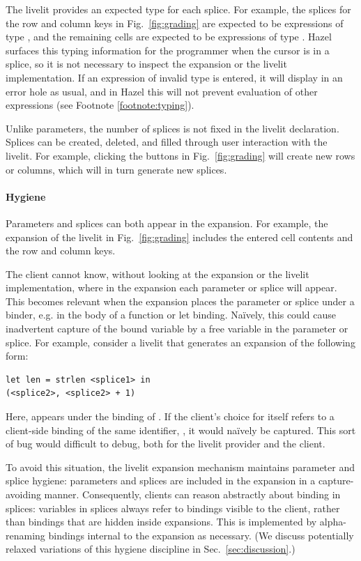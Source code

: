 The livelit provides an expected type for each splice.
For example, the splices for the row and column keys in Fig.~\ref{fig:grading} are expected to be expressions
of type , and the remaining cells are expected to be expressions of type .
Hazel surfaces this typing information for the programmer when the cursor is in a splice,
so it is not necessary to inspect the expansion or the livelit implementation.
If an expression of invalid type is entered, it will display in an error hole as usual,
and in Hazel this will not prevent evaluation of other expressions (see Footnote \ref{footnote:typing}).

Unlike parameters, the number of splices is not fixed in the livelit declaration. Splices can be created,
deleted, and filled through user interaction with the livelit. For example, clicking the \li{+} buttons
in Fig.~\ref{fig:grading} will create new rows or columns, which will in turn generate new splices.

\paragraph{Hygiene}\label{sec:hygiene}
Parameters and splices can both appear in the expansion. For example,
the expansion of the  livelit in Fig.~\ref{fig:grading} includes the
entered cell contents and the row and column keys.

The client cannot know, without looking at the expansion or the livelit implementation,
where in the expansion each parameter or splice will appear. This becomes relevant when
the expansion places the parameter or splice under a binder, e.g. in the body of a function or let binding.
Na\"ively, this could cause inadvertent capture of the bound variable by a free variable
in the parameter or splice. For example, consider a livelit that generates an expansion
of the following form:
\begin{lstlisting}[numbers=none]
let len = strlen <splice1> in
(<splice2>, <splice2> + 1)
\end{lstlisting}
Here,  appears under the binding of . If the client's choice for
 itself refers to a client-side binding of the same identifier, ,
it would na\"ively be captured. This sort of bug would difficult to debug,
both for the livelit provider and the client.

To avoid this situation, the livelit expansion mechanism
maintains parameter and splice hygiene: parameters and splices are included in the expansion
in a capture-avoiding manner.
Consequently, clients can reason abstractly about binding in splices: variables in splices
always refer to bindings visible to the client, rather than bindings that are hidden inside expansions.
This is implemented by alpha-renaming bindings internal to the expansion as necessary.
(We discuss potentially relaxed variations of this hygiene discipline in Sec.~\ref{sec:discussion}.)

